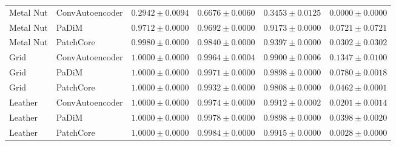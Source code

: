 \begin{table}[t]
{\begin{tabular}{llcccc}
\midrule
Metal Nut & ConvAutoencoder & $0.2942 \pm 0.0094$ & $0.6676 \pm 0.0060$ & $0.3453 \pm 0.0125$ & $0.0000 \pm 0.0000$ \\
Metal Nut & PaDiM & $0.9712 \pm 0.0000$ & $0.9692 \pm 0.0000$ & $0.9173 \pm 0.0000$ & $0.0721 \pm 0.0721$ \\
Metal Nut & PatchCore & $0.9980 \pm 0.0000$ & $0.9840 \pm 0.0000$ & $0.9397 \pm 0.0000$ & $0.0302 \pm 0.0302$ \\
\midrule
Grid & ConvAutoencoder & $1.0000 \pm 0.0000$ & $0.9964 \pm 0.0004$ & $0.9900 \pm 0.0006$ & $0.1347 \pm 0.0100$ \\
Grid & PaDiM & $1.0000 \pm 0.0000$ & $0.9971 \pm 0.0000$ & $0.9898 \pm 0.0000$ & $0.0780 \pm 0.0018$ \\
Grid & PatchCore & $1.0000 \pm 0.0000$ & $0.9932 \pm 0.0000$ & $0.9808 \pm 0.0000$ & $0.0462 \pm 0.0001$ \\
\midrule
Leather & ConvAutoencoder & $1.0000 \pm 0.0000$ & $0.9974 \pm 0.0000$ & $0.9912 \pm 0.0002$ & $0.0201 \pm 0.0014$ \\
Leather & PaDiM & $1.0000 \pm 0.0000$ & $0.9978 \pm 0.0000$ & $0.9898 \pm 0.0000$ & $0.0398 \pm 0.0020$ \\
Leather & PatchCore & $1.0000 \pm 0.0000$ & $0.9984 \pm 0.0000$ & $0.9915 \pm 0.0000$ & $0.0028 \pm 0.0000$ \\
\bottomrule
\end{tabular}}
\end{table}
